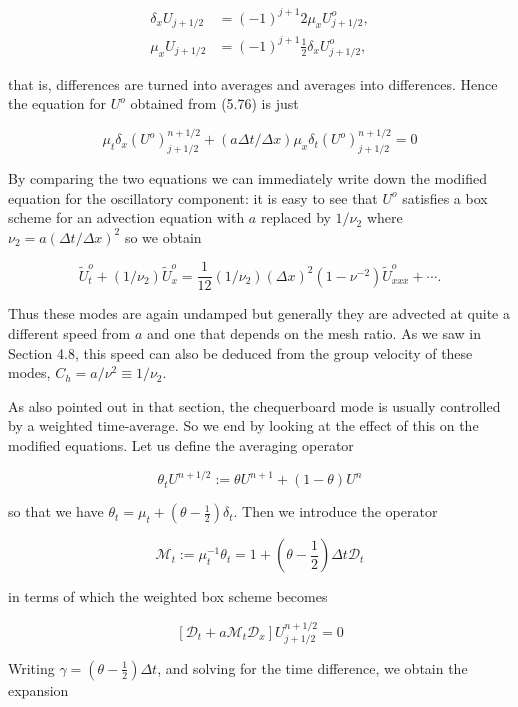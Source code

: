 \documentclass[10pt]{article}
\begin{document}
\[
\begin{aligned}
\delta_{x} U_{j+1 / 2} & =(-1)^{j+1} 2 \mu_{x} U_{j+1 / 2}^{o}, \\
\mu_{x} U_{j+1 / 2} & =(-1)^{j+1} \frac{1}{2} \delta_{x} U_{j+1 / 2}^{o},
\end{aligned}
\]

that is, differences are turned into averages and averages into differences. Hence the equation for \(U^{o}\) obtained from (5.76) is just

\[
\mu_{t} \delta_{x}\left(U^{o}\right)_{j+1 / 2}^{n+1 / 2}+(a \Delta t / \Delta x) \mu_{x} \delta_{t}\left(U^{o}\right)_{j+1 / 2}^{n+1 / 2}=0
\]

By comparing the two equations we can immediately write down the modified equation for the oscillatory component: it is easy to see that \(U^{o}\) satisfies a box scheme for an advection equation with \(a\) replaced by \(1 / \nu_{2}\) where \(\nu_{2}=a(\Delta t / \Delta x)^{2}\) so we obtain

\[
\tilde{U}_{t}^{o}+\left(1 / \nu_{2}\right) \tilde{U}_{x}^{o}=\frac{1}{12}\left(1 / \nu_{2}\right)(\Delta x)^{2}\left(1-\nu^{-2}\right) \tilde{U}_{x x x}^{o}+\cdots .
\]

Thus these modes are again undamped but generally they are advected at quite a different speed from \(a\) and one that depends on the mesh ratio. As we saw in Section 4.8, this speed can also be deduced from the group velocity of these modes, \(C_{h}=a / \nu^{2} \equiv 1 / \nu_{2}\).

As also pointed out in that section, the chequerboard mode is usually controlled by a weighted time-average. So we end by looking at the effect of this on the modified equations. Let us define the averaging operator

\[
\theta_{t} U^{n+1 / 2}:=\theta U^{n+1}+(1-\theta) U^{n}
\]

so that we have \(\theta_{t}=\mu_{t}+\left(\theta-\frac{1}{2}\right) \delta_{t}\). Then we introduce the operator

\[
\mathcal{M}_{t}:=\mu_{t}^{-1} \theta_{t}=1+\left(\theta-\frac{1}{2}\right) \Delta t \mathcal{D}_{t}
\]

in terms of which the weighted box scheme becomes

\[
\left[\mathcal{D}_{t}+a \mathcal{M}_{t} \mathcal{D}_{x}\right] U_{j+1 / 2}^{n+1 / 2}=0
\]

Writing \(\gamma=\left(\theta-\frac{1}{2}\right) \Delta t\), and solving for the time difference, we obtain the expansion
\end{document}
